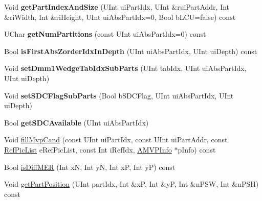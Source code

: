 \begin{DoxyCompactItemize}
Void {\bfseries get\+Part\+Index\+And\+Size} (U\+Int ui\+Part\+Idx, U\+Int \&rui\+Part\+Addr, Int \&ri\+Width, Int \&ri\+Height, U\+Int ui\+Abs\+Part\+Idx=0, Bool b\+L\+CU=false) const
\item 
\mbox{\label{class_t_com_data_c_u_a1b5818c4d13dfaf8d00add0b19706aae}} 
U\+Char {\bfseries get\+Num\+Partitions} (const U\+Int ui\+Abs\+Part\+Idx=0) const
\item 
\mbox{\label{class_t_com_data_c_u_a55e2009a75837a189884270a0a6529b4}} 
Bool {\bfseries is\+First\+Abs\+Zorder\+Idx\+In\+Depth} (U\+Int ui\+Abs\+Part\+Idx, U\+Int ui\+Depth) const
\item 
\mbox{\label{class_t_com_data_c_u_ae81600e464434f4dc814f774dbde9dd8}} 
Void {\bfseries set\+Dmm1\+Wedge\+Tab\+Idx\+Sub\+Parts} (U\+Int tab\+Idx, U\+Int ui\+Abs\+Part\+Idx, U\+Int ui\+Depth)
\item 
\mbox{\label{class_t_com_data_c_u_a12792344d88ce9297849adc823ccd22d}} 
Void {\bfseries set\+S\+D\+C\+Flag\+Sub\+Parts} (Bool b\+S\+D\+C\+Flag, U\+Int ui\+Abs\+Part\+Idx, U\+Int ui\+Depth)
\item 
\mbox{\label{class_t_com_data_c_u_a09f56b68c268ff170b135874b05837cb}} 
Bool {\bfseries get\+S\+D\+C\+Available} (U\+Int ui\+Abs\+Part\+Idx)
\item 
Void \hyperlink{class_t_com_data_c_u_ae25f9efe94d35362e3042f287810c12a}{fill\+Mvp\+Cand} (const U\+Int ui\+Part\+Idx, const U\+Int ui\+Part\+Addr, const \hyperlink{_type_def_8h_a93cea48eb9dcfd661168dee82e41b384}{Ref\+Pic\+List} e\+Ref\+Pic\+List, const Int i\+Ref\+Idx, \hyperlink{_t_com_motion_info_8h_a4dfe7465dec69a9356d5166304173f8c}{A\+M\+V\+P\+Info} $\ast$p\+Info) const
\item 
Bool \hyperlink{class_t_com_data_c_u_ae4a02a54f072f8c1e2d0c9d3654b350b}{is\+Diff\+M\+ER} (Int xN, Int yN, Int xP, Int yP) const
\item 
Void \hyperlink{class_t_com_data_c_u_a86e93d7523e3b74e5c7ba7c7736a62a1}{get\+Part\+Position} (U\+Int part\+Idx, Int \&xP, Int \&yP, Int \&n\+P\+SW, Int \&n\+P\+SH) const
\item 
\mbox{\label{class_t_com_data_c_u_a162ef62775e3d429a5030816e5e3bc8d}} 

\end{DoxyCompactItemize}
